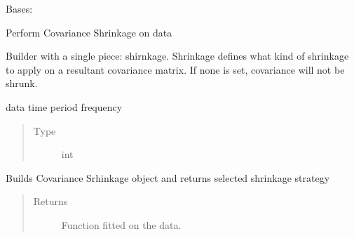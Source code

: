 \documentclass[letterpaper,10pt,english]{sphinxmanual}
\begin{document}
\begin{fulllineitems}
\label{\detokenize{dalio.pipe:dalio.pipe.CovShrink}}
Bases: {\hyperref[\detokenize{dalio.pipe:dalio.pipe.pipe.PipeBuilder}]{}}

Perform Covariance Shrinkage on data

Builder with a single piece: shirnkage. Shrinkage defines what kind of
shrinkage to apply on a resultant covariance matrix. If none is set,
covariance will not be shrunk.

\begin{fulllineitems}
\label{\detokenize{dalio.pipe:dalio.pipe.CovShrink.frequency}}
data time period frequency
\begin{quote}\begin{description}
\item[{Type}] \leavevmode
int

\end{description}\end{quote}

\end{fulllineitems}


\begin{fulllineitems}
\label{\detokenize{dalio.pipe:dalio.pipe.CovShrink.build_model}}
Builds Covariance Srhinkage object and returns selected shrinkage
strategy
\begin{quote}\begin{description}
\item[{Returns}] \leavevmode
Function fitted on the data.

\end{description}\end{quote}

\end{fulllineitems}



\end{fulllineitems}
\end{document}
